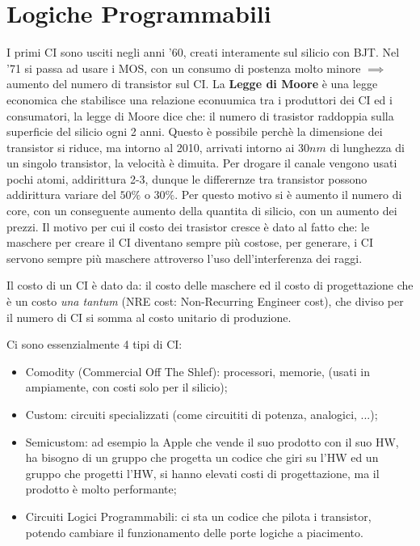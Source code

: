 \documentclass[12pt]{article}
\begin{document}
\newpage
\section{Logiche Programmabili}
I primi CI sono usciti negli anni '60, creati interamente sul silicio con BJT. Nel '71 si passa ad usare i MOS, con un consumo di postenza molto minore $ \implies $ aumento del numero di transistor sul CI. La \textbf{Legge di Moore} \`e una legge economica che stabilisce una relazione econuumica tra i produttori dei CI ed i consumatori, la legge di Moore dice che: il numero di trasistor raddoppia sulla superficie del silicio ogni 2 anni. Questo \`e possibile perch\`e la dimensione dei transistor si riduce, ma intorno al 2010, arrivati intorno ai $30nm$ di lunghezza di un singolo transistor, la velocit\`a \`e dimuita. Per drogare il canale vengono usati pochi atomi, addirittura 2-3, dunque le differernze tra transistor possono addirittura variare del $50\%$ o $30\%$. Per questo motivo si \`e aumento il numero di core, con un conseguente aumento della quantita di silicio, con un aumento dei prezzi. Il motivo per cui il costo dei trasistor cresce \`e dato al fatto che: le maschere per creare il CI diventano sempre pi\`u costose, per generare, i CI servono sempre pi\`u maschere attroverso l'uso dell'interferenza dei raggi.

Il costo di un CI \`e dato da: il costo delle maschere ed il costo di progettazione che \`e un costo \emph{una tantum} (NRE cost: Non-Recurring Engineer cost), che diviso per il numero di CI si somma al costo unitario di produzione.

Ci sono essenzialmente 4 tipi di CI:
\begin{itemize}
    \item Comodity (Commercial Off The Shlef): processori, memorie, (usati in ampiamente, con costi solo per il silicio);
    \item Custom: circuiti specializzati (come circuititi di potenza, analogici, ...);
    \item Semicustom: ad esempio la Apple che vende il suo prodotto con il suo HW, ha bisogno di un gruppo che progetta un codice che giri su l'HW ed un gruppo che progetti l'HW, si hanno elevati costi di progettazione, ma il prodotto \`e molto performante;
    \item Circuiti Logici Programmabili: ci sta un codice che pilota i transistor, potendo cambiare il funzionamento delle porte logiche a piacimento.
\end{itemize}
\end{document}
